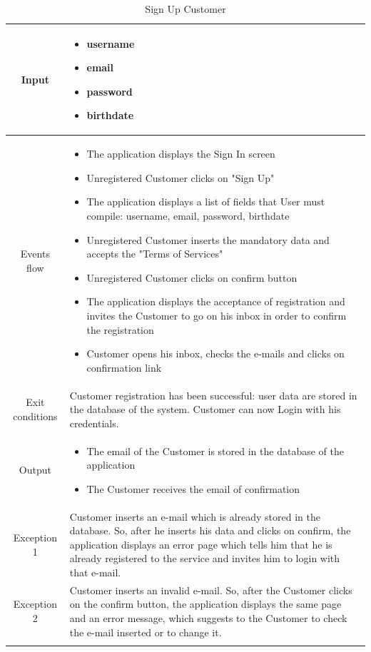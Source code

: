 \begin{longtable}{ | c | p{10cm} | }
    Input            & \begin{itemize}
        \item username
        \item email
        \item password
        \item birthdate
    \end{itemize} \\ \hline
    Events flow      & \begin{itemize}[nosep,after=\strut]
        \item The application displays the Sign In screen
        \item Unregistered Customer clicks on "Sign Up"
        \item The application displays a list of fields that User must compile: username, email, password, birthdate
        \item Unregistered Customer inserts the mandatory data and accepts the "Terms of Services"
        \item Unregistered Customer clicks on confirm button
        \item The application displays the acceptance of registration and invites the Customer to go on his inbox in order to confirm the registration
        \item Customer opens his inbox, checks the e-mails and clicks on confirmation link
    \end{itemize} \\
    \hline
    Exit conditions  & Customer registration has been successful: user data are stored in the database of the system. Customer can now Login with his credentials. \\ \hline
    Output           & \begin{itemize}
        \item The email of the Customer is stored in the database of the application
        \item The Customer receives the email of confirmation
    \end{itemize} \\
    \hline
    \hline
    Exception 1      & Customer inserts an e-mail which is already stored in the database. So, after he inserts his data and clicks on confirm, the application displays an error page which tells him that he is already registered to the service and invites him to login with that e-mail. \\
    \hline
    Exception 2      & Customer inserts an invalid e-mail. So, after the Customer clicks on the confirm button, the application displays the same page and an error message, which suggests to the Customer to check the e-mail inserted or to change it. \\
    \hline
    \caption{Sign Up Customer} \\
\end{longtable}
